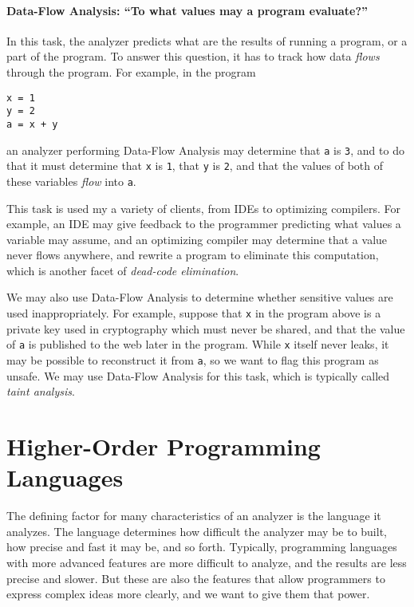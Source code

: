 \documentclass[12pt, oneside]{book}
\begin{document}
\paragraph{Data-Flow Analysis: “To what values may a program evaluate?”}

In this task, the analyzer predicts what are the results of running a program, or a part of the program. To answer this question, it has to track how data \emph{flows} through the program. For example, in the program

\begin{Verbatim}
x = 1
y = 2
a = x + y
\end{Verbatim}

\noindent an analyzer performing Data-Flow Analysis may determine that \texttt{a} is \texttt{3}, and to do that it must determine that \texttt{x} is \texttt{1}, that \texttt{y} is \texttt{2}, and that the values of both of these variables \emph{flow} into \texttt{a}.

This task is used my a variety of clients, from IDEs to optimizing compilers. For example, an IDE may give feedback to the programmer predicting what values a variable may assume, and an optimizing compiler may determine that a value never flows anywhere, and rewrite a program to eliminate this computation, which is another facet of \emph{dead-code elimination}.

We may also use Data-Flow Analysis to determine whether sensitive values are used inappropriately. For example, suppose that \texttt{x} in the program above is a private key used in cryptography which must never be shared, and that the value of \texttt{a} is published to the web later in the program. While \texttt{x} itself never leaks, it may be possible to reconstruct it from \texttt{a}, so we want to flag this program as unsafe. We may use Data-Flow Analysis for this task, which is typically called \emph{taint analysis}.

\section{Higher-Order Programming Languages}
\label{section:higher-order-programming-languages}

The defining factor for many characteristics of an analyzer is the language it analyzes. The language determines how difficult the analyzer may be to built, how precise and fast it may be, and so forth. Typically, programming languages with more advanced features are more difficult to analyze, and the results are less precise and slower. But these are also the features that allow programmers to express complex ideas more clearly, and we want to give them that power.
\end{document}
